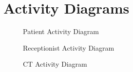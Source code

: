 \documentclass[
  10pt,
  a4paperpaper,
  DIV=11,
  numbers=noendperiod,
  oneside]{scrreprt}
\begin{document}
\newpage{}

\section{Activity Diagrams}\label{activity-diagrams}

\begin{figure}[htbp]


\caption{\label{fig-pat_act}Patient Activity Diagram}

\end{figure}%

\begin{figure}[htbp]


\caption{\label{fig-recep_act}Receptionist Activity Diagram}

\end{figure}%

\begin{figure}[htbp]


\caption{\label{fig-ct_act}CT Activity Diagram}

\end{figure}%
\end{document}
